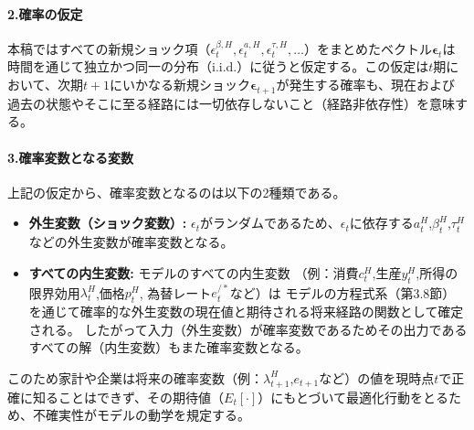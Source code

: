 \paragraph{2.確率の仮定}
\label{sec:chapter3_definitions_variables_stochastic_nature_assumptions}
本稿ではすべての新規ショック項（\(\epsilon_t^{\beta,H},\epsilon_t^{a,H},\epsilon_t^{\tau,H},\dots\)）をまとめたベクトル\(\boldsymbol{\epsilon}_t\)は時間を通じて独立かつ同一の分布（i.i.d.）に従うと仮定する。この仮定は\(t\)期において、次期\(t+1\)にいかなる新規ショック\(\boldsymbol{\epsilon}_{t+1}\)が発生する確率も、現在および過去の状態やそこに至る経路には一切依存しないこと（経路非依存性）を意味する。

\paragraph{3.確率変数となる変数}
\label{sec:chapter3_definitions_variables_stochastic_nature_variables}
上記の仮定から、確率変数となるのは以下の2種類である。
\begin{itemize}
    \item
    \label{itm:chapter3_definitions_variables_stochastic_nature_variables_exogenous}
        \textbf{外生変数（ショック変数）:} \(\epsilon_t\)がランダムであるため、\(\epsilon_t\)に依存する\(a_t^H\),\(\beta_t^H\),\(\tau_t^H\)などの外生変数が確率変数となる。
    \item
    \label{itm:chapter3_definitions_variables_stochastic_nature_variables_endogenous}
        \textbf{すべての内生変数:} モデルのすべての内生変数
        （例：消費\(c_t^H\),生産\(y_t^H\),所得の限界効用\(\lambda_t^H\),価格\(p_t^H\),
        為替レート\(e_t^{/*}\)など）は
        モデルの方程式系（第3.8節）を通じて確率的な外生変数の現在値と期待される将来経路の関数として確定される。
        したがって入力（外生変数）が確率変数であるためその出力であるすべての解（内生変数）もまた確率変数となる。
\end{itemize}
このため家計や企業は将来の確率変数（例：\(\lambda_{t+1}^H\),\(e_{t+1}\)など）の値を現時点\(t\)で正確に知ることはできず、その期待値（\(E_t[\cdot]\)）にもとづいて最適化行動をとるため、不確実性がモデルの動学を規定する。
